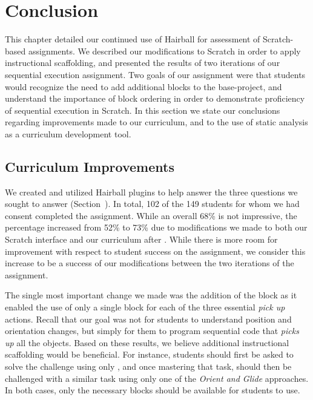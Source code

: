 \section{Conclusion} 
This chapter detailed our continued use of Hairball for assessment of
Scratch-based assignments. We described our modifications to Scratch in order
to apply instructional scaffolding, and presented the results of two iterations
of our sequential execution assignment. Two goals of our assignment were that
students would recognize the need to add additional blocks to the base-project,
and understand the importance of block ordering in order to demonstrate
proficiency of sequential execution in Scratch. In this section we state our
conclusions regarding improvements made to our curriculum, and to the use of
static analysis as a curriculum development tool.

\subsection{Curriculum Improvements}
We created and utilized Hairball plugins to help answer the three questions we
sought to answer (Section~). In total, 102 of the 149
students for whom we had consent completed the assignment. While an overall
68\% is not impressive, the percentage increased from 52\% to 73\% due to
modifications we made to both our Scratch interface and our curriculum after
\sone{}. While there is more room for improvement with respect to student
success on the assignment, we consider this increase to be a success of our
modifications between the two iterations of the assignment.

The single most important change we made was the addition of the \glideto{}
block as it enabled the use of only a single block for each of the three
essential \emph{pick up} actions. Recall that our goal was not for students to
understand position and orientation changes, but simply for them to program
sequential code that \emph{picks up} all the objects. Based on these results,
we believe additional instructional scaffolding would be beneficial. For
instance, students should first be asked to solve the challenge using only
\glideto{}, and once mastering that task, should then be challenged with a
similar task using only one of the \emph{Orient and Glide} approaches. In both
cases, only the necessary blocks should be available for students to use.

